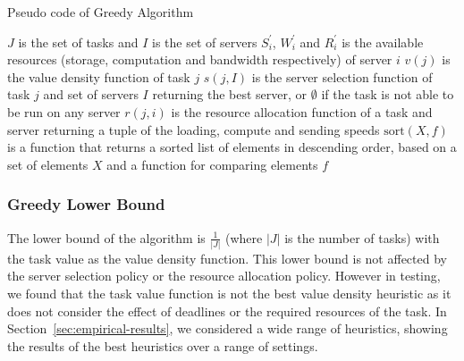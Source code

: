 \begin{algorithm}
    \caption{Pseudo code of Greedy Algorithm}
    \label{alg:greedy-algorithm}
    \begin{algorithmic}
        \REQUIRE $J$ is the set of tasks and $I$ is the set of servers
        \REQUIRE $S^{'}_i$, $W^{'}_i$ and $R^{'}_i$ is the available resources
            (storage, computation and bandwidth respectively) of server $i$
        \REQUIRE $v(j)$ is the value density function of task $j$
        \REQUIRE $s(j, I)$ is the server selection function of task $j$ and set of servers $I$ returning the best
            server, or $\emptyset$ if the task is not able to be run on any server
        \REQUIRE $r(j, i)$ is the resource allocation function of a task and server returning a tuple of the
            loading, compute and sending speeds
        \REQUIRE $\text{sort}(X, f)$ is a function that returns a sorted list of elements in descending order, based
            on a set of elements $X$ and a function for comparing elements $f$

            \ENDIF
        \ENDFOR
    \end{algorithmic}
\end{algorithm}

\subsubsection{Greedy Lower Bound}
\label{subsubsec:greedy-lower-bound}
The lower bound of the algorithm is $\frac{1}{\left|J\right|}$ (where $\left|J\right|$ is the number of tasks) with
the task value as the value density function. This lower bound is not affected by the server selection policy or the
resource allocation policy.
However in testing, we found that the task value function is not the best value density heuristic as it does not
consider the effect of deadlines or the required resources of the task. In Section~\ref{sec:empirical-results}, we
considered a wide range of heuristics, showing the results of the best heuristics over a range of settings.

